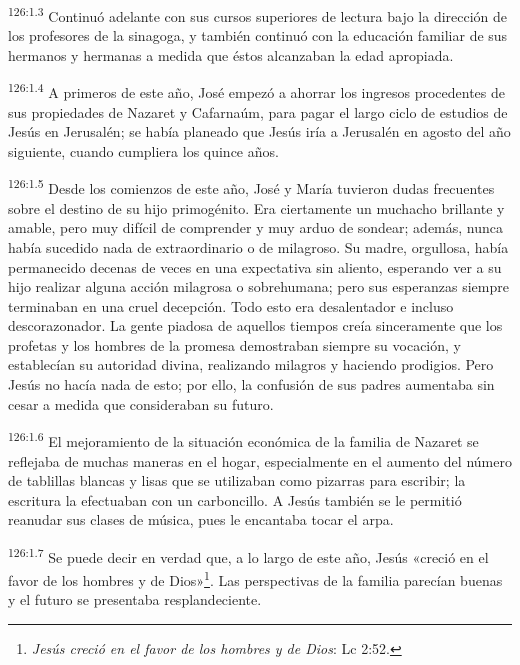 \par
\textsuperscript{126:1.3} Continuó adelante con sus cursos superiores de lectura bajo la dirección de los profesores de la sinagoga, y también continuó con la educación familiar de sus hermanos y hermanas a medida que éstos alcanzaban la edad apropiada.

\par
\textsuperscript{126:1.4} A primeros de este año, José empezó a ahorrar los ingresos procedentes de sus propiedades de Nazaret y Cafarnaúm, para pagar el largo ciclo de estudios de Jesús en Jerusalén; se había planeado que Jesús iría a Jerusalén en agosto del año siguiente, cuando cumpliera los quince años.

\par
\textsuperscript{126:1.5} Desde los comienzos de este año, José y María tuvieron dudas frecuentes sobre el destino de su hijo primogénito. Era ciertamente un muchacho brillante y amable, pero muy difícil de comprender y muy arduo de sondear; además, nunca había sucedido nada de extraordinario o de milagroso. Su madre, orgullosa, había permanecido decenas de veces en una expectativa sin aliento, esperando ver a su hijo realizar alguna acción milagrosa o sobrehumana; pero sus esperanzas siempre terminaban en una cruel decepción. Todo esto era desalentador e incluso descorazonador. La gente piadosa de aquellos tiempos creía sinceramente que los profetas y los hombres de la promesa demostraban siempre su vocación, y establecían su autoridad divina, realizando milagros y haciendo prodigios. Pero Jesús no hacía nada de esto; por ello, la confusión de sus padres aumentaba sin cesar a medida que consideraban su futuro.

\par
\textsuperscript{126:1.6} El mejoramiento de la situación económica de la familia de Nazaret se reflejaba de muchas maneras en el hogar, especialmente en el aumento del número de tablillas blancas y lisas que se utilizaban como pizarras para escribir; la escritura la efectuaban con un carboncillo. A Jesús también se le permitió reanudar sus clases de música, pues le encantaba tocar el arpa.

\par
\textsuperscript{126:1.7} Se puede decir en verdad que, a lo largo de este año, Jesús «creció en el favor de los hombres y de Dios»\footnote{\textit{Jesús creció en el favor de los hombres y de Dios}: Lc 2:52.}. Las perspectivas de la familia parecían buenas y el futuro se presentaba resplandeciente.

